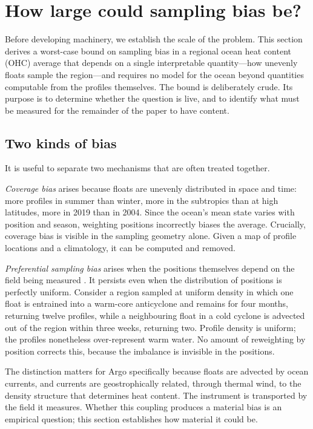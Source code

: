 \section{How large could sampling bias be?}
\label{sec:scope}

Before developing machinery, we establish the scale of the problem. This section derives a
worst-case bound on sampling bias in a regional ocean heat content (OHC) average that depends
on a single interpretable quantity---how unevenly floats sample the region---and requires no
model for the ocean beyond quantities computable from the profiles themselves. The bound is
deliberately crude. Its purpose is to determine whether the question is live, and to identify
what must be measured for the remainder of the paper to have content.

\subsection{Two kinds of bias}
\label{sec:two-kinds}

It is useful to separate two mechanisms that are often treated together.

\emph{Coverage bias} arises because floats are unevenly distributed in space and time: more
profiles in summer than winter, more in the subtropics than at high latitudes, more in 2019
than in 2004. Since the ocean's mean state varies with position and season, weighting
positions incorrectly biases the average. Crucially, coverage bias is visible in the sampling
geometry alone. Given a map of profile locations and a climatology, it can be computed and
removed.

\emph{Preferential sampling bias} arises when the positions themselves depend on the field
being measured \citep{diggle2010}. It persists even when the distribution of positions is
perfectly uniform. Consider a region sampled at uniform density in which one float is
entrained into a warm-core anticyclone and remains for four months, returning twelve profiles,
while a neighbouring float in a cold cyclone is advected out of the region within three weeks,
returning two. Profile density is uniform; the profiles nonetheless over-represent warm water.
No amount of reweighting by position corrects this, because the imbalance is invisible in the
positions.

The distinction matters for Argo specifically because floats are advected by ocean currents,
and currents are geostrophically related, through thermal wind, to the density structure that
determines heat content. The instrument is transported by the field it measures. Whether this
coupling produces a material bias is an empirical question; this section establishes how
material it could be.

